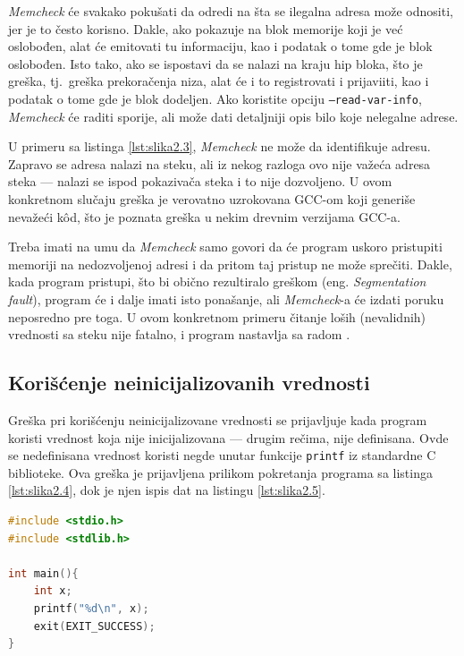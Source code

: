 \documentclass[12pt,oneside]{memoir}
\theoremstyle{plain}
\theoremstyle{definition}
\begin{document}
\textit{Memcheck} će svakako pokušati da odredi na šta se ilegalna adresa može odnositi, jer je to često korisno. Dakle, ako pokazuje na blok memorije koji je već oslobođen, alat će emitovati tu informaciju, kao i podatak o tome gde je blok oslobođen. Isto tako, ako se ispostavi da se nalazi na kraju hip bloka, što je greška, tj.~greška prekoračenja niza, alat će i to registrovati i prijaviiti, kao i podatak o tome gde je blok dodeljen. Ako koristite opciju \texttt{--read-var-info}, \textit{Memcheck} će raditi sporije, ali može dati detaljniji opis bilo koje nelegalne adrese.

U primeru sa listinga \ref{lst:slika2.3}, \textit{Memcheck} ne može da identifikuje adresu. Zapravo se adresa nalazi na steku, ali iz nekog razloga ovo nije važeća adresa steka --- nalazi se ispod pokazivača steka i to nije dozvoljeno. U ovom konkretnom slučaju greška je verovatno uzrokovana GCC-om koji generiše nevažeći k\^od, što je poznata greška u nekim drevnim verzijama GCC-a.

Treba imati na umu da \textit{Memcheck} samo govori da će program uskoro pristupiti memoriji na nedozvoljenoj adresi i da pritom taj pristup ne može sprečiti. Dakle, kada program pristupi, što bi obično rezultiralo greškom (eng. \textit{Segmentation fault}), program će i dalje imati isto ponašanje, ali \textit{Memcheck}-a će izdati poruku neposredno pre toga. U ovom konkretnom primeru čitanje loših (nevalidnih) vrednosti sa steku nije fatalno, i program nastavlja sa radom \cite{Memcheck}. 

\subsection{Korišćenje neinicijalizovanih vrednosti}
Greška pri korišćenju neinicijalizovane vrednosti se prijavljuje kada program koristi vrednost koja nije inicijalizovana --- drugim rečima, nije definisana. Ovde se nedefinisana vrednost koristi negde unutar funkcije \texttt{printf} iz standardne C biblioteke. Ova greška je prijavljena prilikom pokretanja programa sa listinga \ref{lst:slika2.4}, dok je njen ispis dat na listingu \ref{lst:slika2.5}.

\begin{lstlisting}[style=mystyle,caption={Program koji izaziva grešku korišćenja neinicijalizovanih vrednosti}, label={lst:slika2.4},language={C}] 
#include <stdio.h>
#include <stdlib.h>

int main(){
	int x;
	printf("%d\n", x);
	exit(EXIT_SUCCESS);
}
\end{lstlisting}
\end{document}
